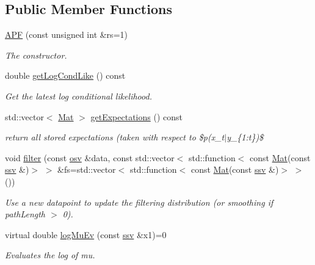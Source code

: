 \subsection*{Public Member Functions}
\begin{DoxyCompactItemize}
\item 
\hyperlink{classpf_1_1APF_a91c90bd5cd0703b03b1f157e09215ed2}{A\+PF} (const unsigned int \&rs=1)
\begin{DoxyCompactList}\small\item\em The constructor. \end{DoxyCompactList}\item 
double \hyperlink{classpf_1_1APF_a254e3d8de21bee812d89a3ad54aaebca}{get\+Log\+Cond\+Like} () const 
\begin{DoxyCompactList}\small\item\em Get the latest log conditional likelihood. \end{DoxyCompactList}\item 
std\+::vector$<$ \hyperlink{classpf_1_1APF_a771c0848fc35bf75e2d3f93bc4ee42ab}{Mat} $>$ \hyperlink{classpf_1_1APF_a2acc511dfc0ab4de6bfb7c44fb20023a}{get\+Expectations} () const 
\begin{DoxyCompactList}\small\item\em return all stored expectations (taken with respect to \$p(x\+\_\+t$\vert$y\+\_\+\{1\+:t\})\$ \end{DoxyCompactList}\item 
void \hyperlink{classpf_1_1APF_a060ab6fca79f677b89872274fd42e138}{filter} (const \hyperlink{classpf_1_1APF_a852db242b5d02c58dc4e6a183a8cab65}{osv} \&data, const std\+::vector$<$ std\+::function$<$ const \hyperlink{classpf_1_1APF_a771c0848fc35bf75e2d3f93bc4ee42ab}{Mat}(const \hyperlink{classpf_1_1APF_aa7fe7efd37dc23b06812aebdee256897}{ssv} \&)$>$ $>$ \&fs=std\+::vector$<$ std\+::function$<$ const \hyperlink{classpf_1_1APF_a771c0848fc35bf75e2d3f93bc4ee42ab}{Mat}(const \hyperlink{classpf_1_1APF_aa7fe7efd37dc23b06812aebdee256897}{ssv} \&)$>$ $>$())
\begin{DoxyCompactList}\small\item\em Use a new datapoint to update the filtering distribution (or smoothing if path\+Length $>$ 0). \end{DoxyCompactList}\item 
virtual double \hyperlink{classpf_1_1APF_a83b46eca3002716f355bf3cd29968433}{log\+Mu\+Ev} (const \hyperlink{classpf_1_1APF_aa7fe7efd37dc23b06812aebdee256897}{ssv} \&x1)=0
\begin{DoxyCompactList}\small\item\em Evaluates the log of mu. \end{DoxyCompactList}\item 

\end{DoxyCompactItemize}
